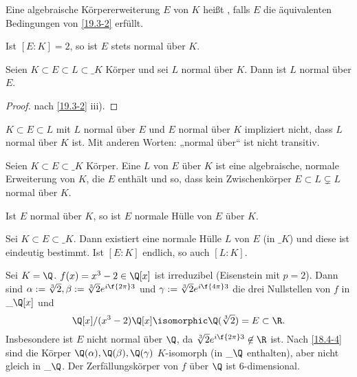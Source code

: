 \begin{df} \label{19.3-3}
	Eine algebraische Körpererweiterung $E$ von $K$ heißt , falls $E$ die äquivalenten Bedingungen von \ref{19.3-2} erfüllt.
\end{df}

\begin{note}
	Ist $[E : K] = 2$, so ist $E$ stets normal über $K$.
\end{note}

\begin{kor} \label{19.3-4}
	Seien $K \subset E \subset L \subset \_K$ Körper und sei $L$ normal über $K$.
	Dann ist $L$ normal über $E$.
	\begin{proof}
		nach \ref{19.3-2} iii).
	\end{proof}
\end{kor}

\begin{note}
	$K \subset E \subset L$ mit $L$ normal über $E$ und $E$ normal über $K$ impliziert nicht, dass $L$ normal über $K$ ist.
	Mit anderen Worten: „normal über“ ist nicht transitiv.
\end{note}

\begin{df} \label{19.3-5}
	Seien $K \subset E \subset \_K$ Körper.
	Eine  $L$ von $E$ über $K$ ist eine algebraische, normale Erweiterung von $K$, die $E$ enthält und so, dass kein Zwischenkörper $E \subset L \subsetneq L$ normal über $K$.
\end{df}

\begin{note}
	Ist $E$ normal über $K$, so ist $E$ normale Hülle von $E$ über $K$.
\end{note}

\begin{st} \label{19.3-6}
	Sei $K \subset E \subset \_K$.
	Dann existiert eine normale Hülle $L$ von $E$ (in $\_K$) und diese ist eindeutig bestimmt.
	Ist $[E : K]$ endlich, so auch $[L : K]$.
\end{st}

\begin{ex} \label{19.3-7}
	Sei $K = \Q$.
	$f(x) = x^3 - 2 \in \Q[x]$ ist irreduzibel (Eisenstein mit $p = 2$).
	Dann sind $\alpha := \sqrt[3]{2}, \beta := \sqrt[3]{2} e^{i\f{2\pi}3}$ und $\gamma := \sqrt[3]{2} e^{i\f{4\pi}3}$ die drei Nullstellen von $f$ in $\_{\Q}[x]$ und
	\[
		\Q[x] / (x^3-2)\Q[x] \isomorphic \Q(\sqrt[3]{2}) = E \subset \R.
	\]
	Insbesondere ist $E$ nicht normal über $\Q$, da $\sqrt[3]{2} e^{i\f{2\pi}3} \not\in \R$ ist.
	Nach \ref{18.4-4} sind die Körper $\Q(\alpha), \Q(\beta), \Q(\gamma)$ $K$-isomorph (in $\_\Q$ enthalten), aber nicht gleich in $\_{\Q}$.
	Der Zerfällungskörper von $f$ über $\Q$ ist 6-dimensional.
\end{ex}


